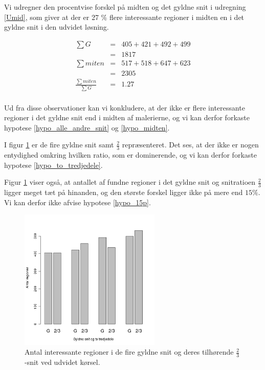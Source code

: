 {Vi udregner den procentvise forskel på midten og det gyldne snit i
udregning \ref{Umid}, som giver at der er 27 \% flere interessante
regioner i midten en i det gyldne snit i den udvidet løsning.
 
\begin{eqnarray}
		\label{Umid}
\sum{G} &=& 405+421+492+499 \\ \nonumber
			&=& 1817 \\\nonumber
\sum{miten} &=& 517+518+647+623 \\\nonumber
			&=& 2305 \\\nonumber
\frac{\sum{miten}}{\sum{G}} &=& 1.27  \\ \nonumber	
\end{eqnarray}

Ud fra disse observationer kan vi konkludere, at der ikke er flere
interessante regioner i det gyldne snit end i midten af malerierne, og
vi kan derfor forkaste hypotese \ref{hypo_alle_andre_snit} og
\ref{hypo_midten}.

I figur \ref{G_vs_to_trejedele_udvidet} er de fire gyldne snit samt
$\frac{2}{3}$ repræsenteret. Det ses, at der ikke er nogen entydighed
omkring hvilken ratio, som er dominerende, og vi kan derfor forkaste hypotese
\ref{hypo_to_tredjedele}.

Figur \ref{G_vs_to_trejedele_udvidet} viser også, at antallet af fundne
regioner i det gyldne snit og snitratioen $\frac{2}{3}$ ligger meget
tæt på hinanden, og den største forskel ligger ikke på mere end $15\%$.
Vi kan derfor ikke afvise hypotese \ref{hypo_15p}.

\begin{figure}[h!]
	\begin{center}
		\includegraphics[width=0.6\textwidth]{afsnit/resultater/billeder/G_vs_to_tredjedeleU.png}
	\end{center}
    \caption{Antal interessante regioner i de fire gyldne snit og deres
    tilhørende $\frac{2}{3}$-snit ved udvidet kørsel.}
	\label{G_vs_to_trejedele_udvidet}
\end{figure}

}
